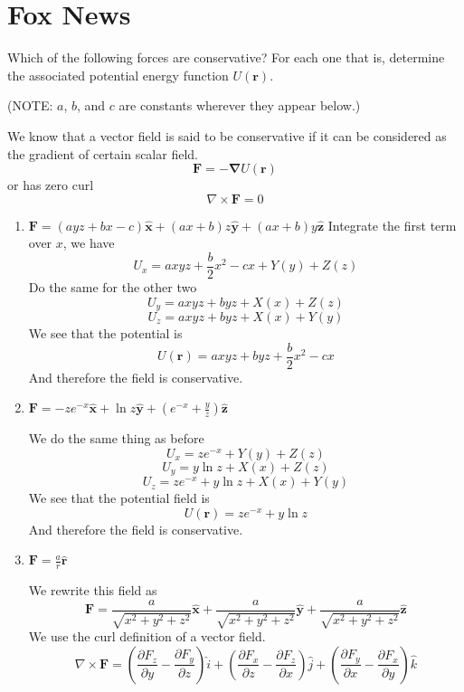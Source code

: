 \documentclass[12pt]{article}
\newcommand{\curl}{\nabla \times}
\newcommand{\unx}{\hat{\mathbf{x}}}
\newcommand{\uny}{\hat{\mathbf{y}}}
\newcommand{\unr}{\hat{\mathbf{r}}}
\begin{document}
\section{Fox News}

Which of the following forces are conservative? For each one that is, determine the associated potential energy function \(U(\mathbf{r})\).

(NOTE: \(a\), \(b\), and \(c\) are constants wherever they appear below.)

We know that a vector field is said to be conservative if it can be considered as the gradient of certain scalar field. 
\[
\mathbf{F} = -\boldsymbol{\nabla}U(\mathbf{r})
\]
or has zero curl
\[
\curl \mathbf{F} = 0
\]

\begin{enumerate}
    \item \(\mathbf{F} = (ayz + bx - c) \unx + (ax + b)z \uny + (ax + b)y \hat{\mathbf{z}}\)
    Integrate the first term over $x$, we have
    \[
    U_x = axyz + \frac{b}{2}x^2 - cx + Y(y) + Z(z)
    \]
    Do the same for the other two
    \[
    U_y = axyz + byz + X(x) + Z(z)
    \]
    \[
    U_z = axyz + byz + X(x) + Y(y)
    \]
    We see that the potential is
    \[
    U(\mathbf{r}) = axyz + byz +  \frac{b}{2}x^2 - cx 
    \]
    And therefore the field is conservative. 
    
    
    \item \(\mathbf{F} = -ze^{-x} \unx  + \ln z \uny + \left(e^{-x} + \frac{y}{z}\right) \hat{\mathbf{z}}\)
    
    We do the same thing as before
    \[
    U_x = ze^{-x} + Y(y) + Z(z)
    \]
    \[
    U_y = y\ln z + X(x) + Z(z)
    \]
    \[
    U_z = ze^{-x} + y\ln z +X(x) + Y(y)
    \]
    We see that the potential field is
    \[
    U(\mathbf{r}) = ze^{-x} + y\ln z
    \]
    And therefore the field is conservative.
    
    \item \(\mathbf{F} = \frac{a}{r} \unr\)

    We rewrite this field as
    \[
    \mathbf{F} = \frac{a}{\sqrt{x^2+y^2+z^2}}\unx + \frac{a}{\sqrt{x^2+y^2+z^2}}\uny + \frac{a}{\sqrt{x^2+y^2+z^2}}\hat{\mathbf{z}}
    \]
    We use the curl definition of a vector field.
    \[
    \curl \mathbf{F} = \left( \frac{\partial F_z}{\partial y} - \frac{\partial F_y}{\partial z} \right) \hat{i} + \left( \frac{\partial F_x}{\partial z} - \frac{\partial F_z}{\partial x} \right) \hat{j} + \left( \frac{\partial F_y}{\partial x} - \frac{\partial F_x}{\partial y} \right) \hat{k}
    \]
    

\end{enumerate}
\end{document}
